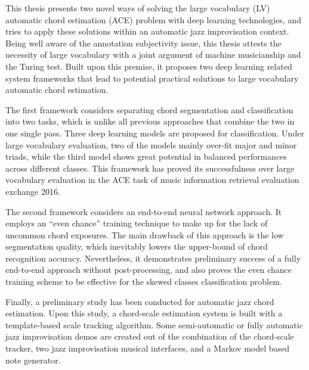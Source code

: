 
This thesis presents two novel ways of solving the large vocabulary (LV) automatic chord estimation (ACE) problem with deep learning technologies, and tries to apply these solutions within an automatic jazz improvisation context. Being well aware of the annotation subjectivity issue, this thesis attests the necessity of large vocabulary with a joint argument of machine musicianship and the Turing test. Built upon this premise, it proposes two deep learning related system frameworks that lead to potential practical solutions to large vocabulary automatic chord estimation.

The first framework considers separating chord segmentation and classification into two tasks, which is unlike all previous approaches that combine the two in one single pass. Three deep learning models are proposed for classification. Under large vocabulary evaluation, two of the models mainly over-fit major and minor triads, while the third model shows great potential in balanced performances across different classes. This framework has proved its successfulness over large vocabulary evaluation in the ACE task of music information retrieval evaluation exchange 2016.

The second framework considers an end-to-end neural network approach. It employs an ``even chance'' training technique to make up for the lack of uncommon chord exposures. The main drawback of this approach is the low segmentation quality, which inevitably lowers the upper-bound of chord recognition accuracy. Nevertheless, it demonstrates preliminary success of a fully end-to-end approach without post-processing, and also proves the even chance training scheme to be effective for the skewed classes classification problem.

Finally, a preliminary study has been conducted for automatic jazz chord estimation. Upon this study, a chord-scale estimation system is built with a template-based scale tracking algorithm. Some semi-automatic or fully automatic jazz improvisation demos are created out of the combination of the chord-scale tracker, two jazz improvisation musical interfaces, and a Markov model based note generator.
